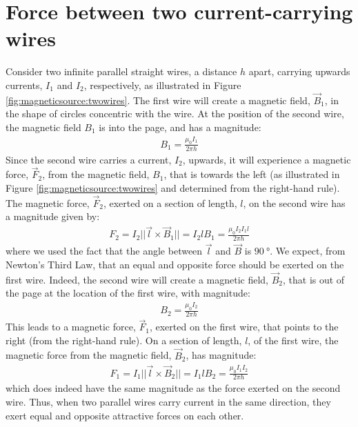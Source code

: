 \section{Force between two current-carrying wires}
Consider two infinite parallel straight wires, a distance $h$ apart, carrying upwards currents, $I_1$ and $I_2$, respectively, as illustrated in Figure \ref{fig:magneticsource:twowires}.
The first wire will create a magnetic field, $\vec B_1$, in the shape of circles concentric with the wire. At the position of the second wire, the magnetic field $B_1$ is into the page, and has a magnitude:
\begin{align*}
B_1 = \frac{\mu_0 I_1}{2\pi h}
\end{align*} 
Since the second wire carries a current, $I_2$, upwards, it will experience a magnetic force, $\vec F_2$, from the magnetic field, $B_1$, that is towards the left (as illustrated in Figure \ref{fig:magneticsource:twowires} and determined from the right-hand rule). The magnetic force, $\vec F_2$, exerted on a section of length, $l$, on the second wire has a magnitude given by:
\begin{align*}
F_2 = I_2 ||\vec l \times \vec B_1||=I_2 l B_1 =\frac{\mu_0 I_2 I_1 l}{2\pi h}
\end{align*}
where we used the fact that the angle between $\vec l$ and $\vec B$ is $\SI{90}{\degree}$. We expect, from Newton's Third Law, that an equal and opposite force should be exerted on the first wire. Indeed, the second wire will create a magnetic field, $\vec B_2$, that is out of the page at the location of the first wire, with magnitude:
\begin{align*}
B_2 = \frac{\mu_0 I_2}{2\pi h}
\end{align*}
This leads to a magnetic force, $\vec F_1$, exerted on the first wire, that points to the right (from the right-hand rule). On a section of length, $l$, of the first wire, the magnetic force from the magnetic field, $\vec B_2$, has magnitude:
\begin{align*}
F_1 = I_1 ||\vec l \times \vec B_2||=I_1 l B_2 =\frac{\mu_0 I_1 I_2}{2\pi h}
\end{align*}
which does indeed have the same magnitude as the force exerted on the second wire. Thus, when two parallel wires carry current in the same direction, they exert equal and opposite attractive forces on each other. 
